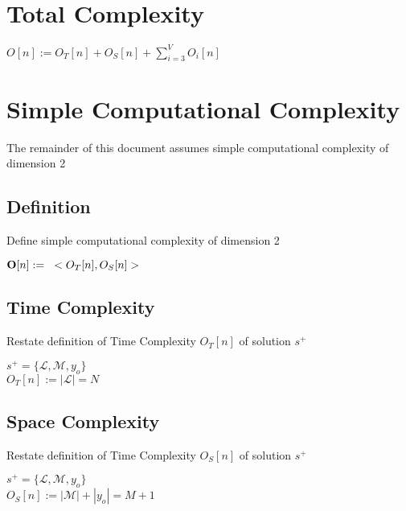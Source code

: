 \documentclass[11pt]{article}
\begin{document}
\section{Total Complexity}
\begin{center}
$O[n] := O_T[n] + O_S[n] + \sum_{i=3}^{V} O_i[n]$
\end{center}





















\newpage
\section{Simple Computational Complexity}
The remainder of this document assumes simple computational complexity of dimension 2

\subsection{Definition}
Define simple computational complexity of dimension 2
\begin{center}
$
\bold{O}[n] := \hspace{3mm} < O_T [n], O_S [n] >
$
\end{center}





\subsection{Time Complexity}
Restate definition of Time Complexity $O_T[n]$ of solution $s^+$
\begin{center}
$
s^+ = \{ \mathcal{L},\mathcal{M},y_o\}
$
\\ \vspace{3mm}
$
O_T[n] := |\mathcal{L}| = N
$
\end{center}



\subsection{Space Complexity}
Restate definition of Time Complexity $O_S[n]$ of solution $s^+$
\begin{center}
$
s^+ = \{ \mathcal{L},\mathcal{M},y_o\}
$
\\ \vspace{2mm}
$
O_S[n] := |\mathcal{M}| + |y_o| = M + 1
$
\end{center}
\end{document}

